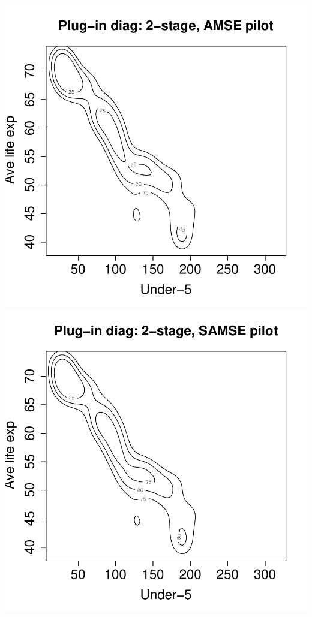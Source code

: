 \documentclass[a4paper,11pt]{article}
\begin{document}
\begin{center}
\includegraphics{kde-008}
\includegraphics{kde-009}
\end{center}
\end{document}
